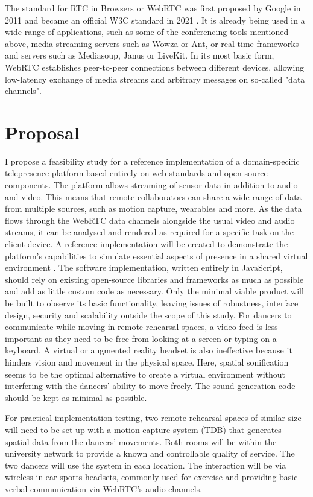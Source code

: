 The standard for \ac{RTC} in Browsers or WebRTC \parencite{webRtcSpec} was first proposed by Google in 2011 and became an official \ac{W3C} standard in 2021 \parencite{webRtcOfficialWebStandard}. It is already being used in a wide range of applications, such as some of the conferencing tools mentioned above, media streaming servers such as Wowza or Ant, or real-time frameworks and servers such as Mediasoup, Janus or LiveKit. In its most basic form, WebRTC establishes peer-to-peer connections between different devices, allowing low-latency exchange of media streams and arbitrary messages on so-called "data channels".

\section{Proposal}
I propose a feasibility study for a reference implementation of a domain-specific telepresence platform based entirely on web standards and open-source components. The platform allows streaming of sensor data in addition to audio and video. This means that remote collaborators can share a wide range of data from multiple sources, such as motion capture, wearables and more. As the data flows through the WebRTC data channels alongside the usual video and audio streams, it can be analysed and rendered as required for a specific task on the client device.
A reference implementation will be created to demonstrate the platform's capabilities to simulate essential aspects of presence in a shared virtual environment \parencite{surveyOfPresence}. The software implementation, written entirely in JavaScript, should rely on existing open-source libraries and frameworks as much as possible and add as little custom code as necessary. Only the minimal viable product will be built to observe its basic functionality, leaving issues of robustness, interface design, security and scalability outside the scope of this study.
For dancers to communicate while moving in remote rehearsal spaces, a video feed is less important as they need to be free from looking at a screen or typing on a keyboard. A virtual or augmented reality headset is also ineffective because it hinders vision and movement in the physical space. Here, spatial sonification seems to be the optimal alternative to create a virtual environment without interfering with the dancers' ability to move freely. The sound generation code should be kept as minimal as possible.

For practical implementation testing, two remote rehearsal spaces of similar size will need to be set up with a motion capture system (TDB) that generates spatial data from the dancers' movements. Both rooms will be within the university network to provide a known and controllable quality of service. The two dancers will use the system in each location. The interaction will be via wireless in-ear sports headsets, commonly used for exercise and providing basic verbal communication via WebRTC's audio channels.

